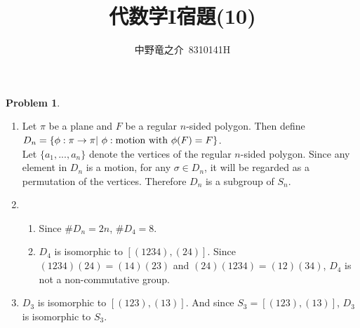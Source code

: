 \documentclass[a4paper, 12pt, fleqn]{article}
\title{代数学I宿題(10)}
\author{中野竜之介\ 8310141H}
\theoremstyle{definition}
\newtheorem{prb}{Problem}
\begin{document}
\maketitle

\begin{prb}
    $ $
    \begin{enumerate}

        \item Let $\pi $ be a plane and $F$ be a regular $n$-sided polygon. Then define $D_n = \{\phi :\pi \to \pi |\ \phi : {\rm motion\ with\ }\phi (F) = F\}$.\\
         Let $\{a_1,...,a_n\}$ denote the vertices of the regular $n$-sided polygon. Since any element in $D_n$ is a motion, for any $\sigma \in D_n$, it will be regarded as a permutation of the vertices. Therefore $D_n$ is a subgroup of $S_n$.

        \item
            \begin{enumerate}
                \item Since $\# D_n = 2n$, $\# D_4 = 8$.
                \item $D_4$ is isomorphic to $[(1234),(24)]$. Since $(1234)(24)=(14)(23)$ and $(24)(1234) = (12)(34)$, $D_4$ is not a non-commutative group.
            \end{enumerate}

        \item $D_3$ is isomorphic to $[(123),(13)]$. And since $S_3 = [(123),(13)]$, $D_3$ is isomorphic to $S_3$.
    \end{enumerate}
\end{prb}
\end{document}
